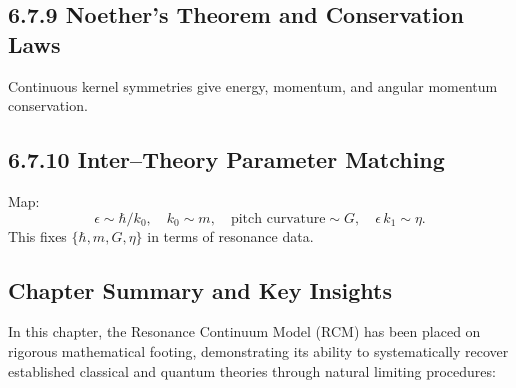 \subsection{6.7.9 Noether’s Theorem and Conservation Laws}

Continuous kernel symmetries give
energy, momentum, and angular momentum conservation.

\medskip

\subsection{6.7.10 Inter–Theory Parameter Matching}

Map:
\[
\epsilon\sim\hbar/k_0,
\quad
k_0\sim m,
\quad
\text{pitch curvature}\sim G,
\quad
\epsilon\,k_1\sim\eta.
\]
This fixes \(\{\hbar,m,G,\eta\}\) in terms of resonance data.

\medskip

\subsection{Chapter Summary and Key Insights}

In this chapter, the Resonance Continuum Model (RCM) has been placed on rigorous mathematical footing, demonstrating its ability to systematically recover established classical and quantum theories through natural limiting procedures:

